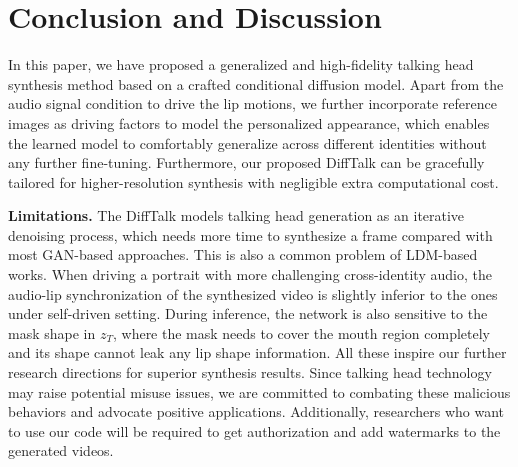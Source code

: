 \documentclass[10pt,twocolumn,letterpaper]{article}
\begin{document}

\section{Conclusion and Discussion}
In this paper, we have proposed a generalized and high-fidelity talking head synthesis method based on a crafted conditional diffusion model. 
Apart from the audio signal condition to drive the lip motions, we further incorporate reference images as driving factors to model the personalized appearance, which enables the learned model to comfortably generalize across different identities without any further fine-tuning. Furthermore, our proposed DiffTalk can be gracefully tailored for higher-resolution synthesis with negligible extra computational cost.


\noindent\textbf{Limitations.} The DiffTalk models talking head generation as an iterative denoising process, which needs more time to synthesize a frame compared with most GAN-based approaches. This is also a common problem of LDM-based works. When driving a portrait with more challenging cross-identity audio, the audio-lip synchronization of the synthesized video is slightly inferior to the ones under self-driven setting. During inference, the network is also sensitive to the mask shape in $z_T$, where the mask needs to cover the mouth region completely and its shape cannot leak any lip shape information. All these inspire our further research directions for superior synthesis results.
Since talking head technology may raise potential misuse issues, we are committed to combating these malicious behaviors and advocate positive applications. Additionally, researchers who want to use our code will be required to get authorization and add watermarks to the generated videos.
\end{document}
